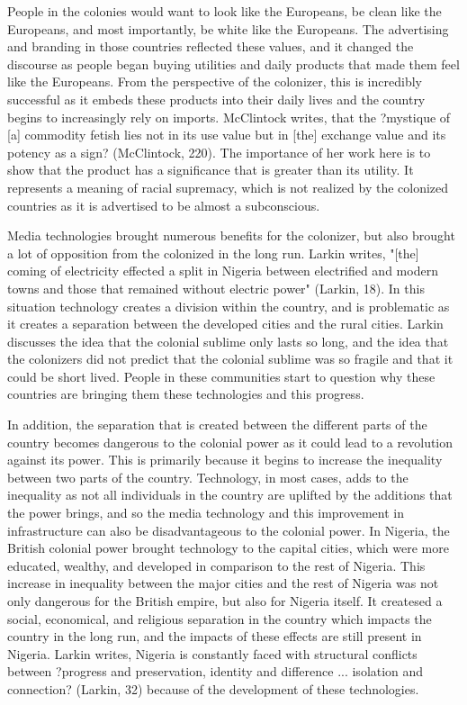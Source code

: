 \documentclass[12pt, oneside]{article}
\begin{document}
\par People in the colonies would want to look like the Europeans, be clean like the Europeans, and most importantly, be white like the Europeans. The advertising and branding in those countries reflected these values, and it changed the discourse as people began buying utilities and daily products that made them feel like the Europeans. From the perspective of the colonizer, this is incredibly successful as it embeds these products into their daily lives and the country begins to increasingly rely on imports. McClintock writes, that the ?mystique of [a] commodity fetish lies not in its use value but in [the] exchange value and its potency as a sign? (McClintock, 220). The importance of her work here is to show that the product has a significance that is greater than its utility. It represents a meaning of racial supremacy, which is not realized by the colonized countries as it is advertised to be almost a subconscious.
\par Media technologies brought numerous benefits for the colonizer, but also brought a lot of opposition from the colonized in the long run. Larkin writes, "[the] coming of electricity effected a split in Nigeria between electrified and modern towns and those that remained without electric power" (Larkin, 18). In this situation technology creates a division within the country, and is problematic as it creates a separation between the developed cities and the rural cities. Larkin discusses the idea that the colonial sublime only lasts so long, and the idea that the colonizers did not predict that the colonial sublime was so fragile and that it could be short lived. People in these communities start to question why these countries are bringing them these technologies and this progress. 
\par In addition, the separation that is created between the different parts of the country becomes dangerous to the colonial power as it could lead to a revolution against its power. This is primarily because it begins to increase the inequality between two parts of the country. Technology, in most cases, adds to the inequality as not all individuals in the country are uplifted by the additions that the power brings, and so the media technology and this improvement in infrastructure can also be disadvantageous to the colonial power. In Nigeria, the British colonial power brought technology to the capital cities, which were more educated, wealthy, and developed in comparison to the rest of Nigeria. This increase in inequality between the major cities and the rest of Nigeria was not only dangerous for the British empire, but also for Nigeria itself. It createsed a social, economical, and religious separation in the country which impacts the country in the long run, and the impacts of these effects are still present in Nigeria. Larkin writes, Nigeria is constantly faced with structural conflicts between ?progress and preservation, identity and difference ... isolation and connection? (Larkin, 32) because of the development of these technologies.
\end{document}
